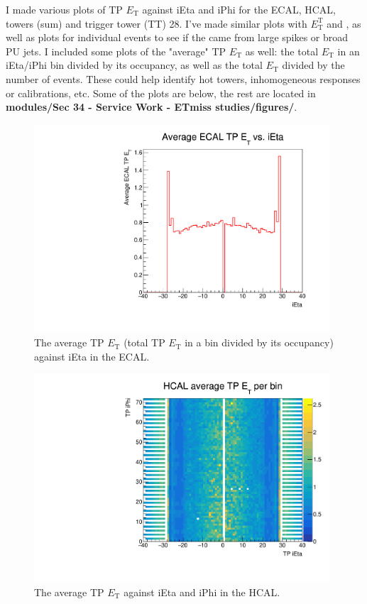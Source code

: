 I made various plots of TP $E_{\mathrm{T}}$ against iEta and iPhi for the ECAL, HCAL, towers (sum) and trigger tower (TT) 28. I've made similar plots with $E_{\mathrm{T}}^{\mathrm{T}}$ and \etmiss, as well as plots for individual events to see if the \etmiss came from large spikes or broad PU jets. I included some plots of the "average" TP $E_{\mathrm{T}}$ as well: the total $E_{\mathrm{T}}$ in an iEta/iPhi bin divided by its occupancy, as well as the total $E_{\mathrm{T}}$ divided by the number of events. These could help identify hot towers, inhomogeneous responses or calibrations, etc. Some of the plots are below, the rest are located in \textbf{modules/Sec 34 - Service Work - ETmiss studies/figures/}.

\begin{figure}[htbp]
\centering
\includegraphics[width=110mm]{figures/MET_studies_v6/Plots/ECAL/ECALTPETEta.pdf}
\caption{The average TP $E_{\mathrm{T}}$ (total TP $E_{\mathrm{T}}$ in a bin divided by its occupancy) against iEta in the ECAL.}
\end{figure}

\begin{figure}[htbp]
\centering
\includegraphics[width=110mm]{figures/MET_studies_v6/Plots/HCAL/HCALavgTPETEtaPhi.pdf}
\caption{The average TP $E_{\mathrm{T}}$ against iEta and iPhi in the HCAL.}
\end{figure}

